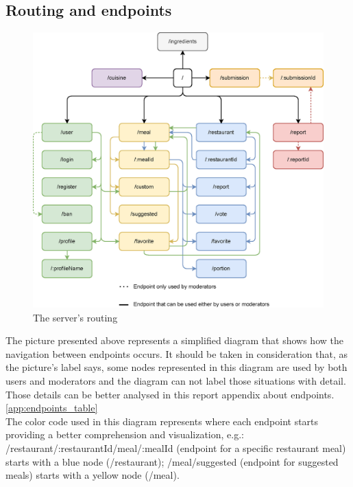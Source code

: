 \subsection{Routing and endpoints}

\begin{figure}[H]
    \begin{center}
        \includegraphics[scale=0.8]{_figures/endpoints_diagram.eps}
        \caption{The server's routing}
    \end{center}
\end{figure}

The picture presented above represents a simplified diagram that shows how the navigation between endpoints occurs.
It should be taken in consideration that, as the picture's label says, some nodes represented in this diagram are used by 
both users and moderators and the diagram can not label those situations with detail. Those details can be better analysed
in this report appendix about endpoints.\ref{app:endpoints_table} \\

The color code used in this diagram represents where each endpoint starts providing a better comprehension
and visualization, e.g.: /restaurant/:restaurantId/meal/:mealId (endpoint for a specific restaurant meal) starts with a blue
node (/restaurant); /meal/suggested (endpoint for suggested meals) starts with a yellow node (/meal).\\

